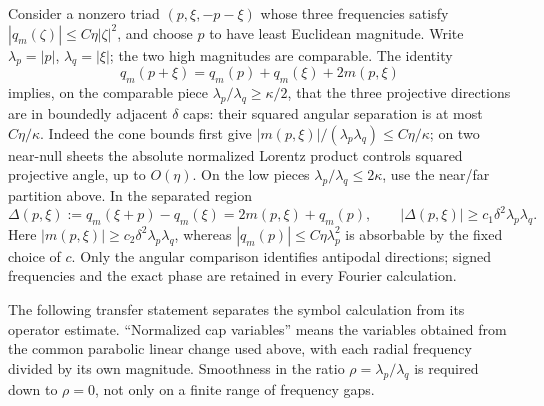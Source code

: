 \documentclass[11pt,a4paper]{article}
\numberwithin{equation}{section}
\theoremstyle{definition}
\begin{document}
Consider a nonzero triad $(p,\xi,-p-\xi)$ whose three frequencies satisfy
$|q_m(\zeta)|\leq C\eta|\zeta|^2$, and choose $p$ to have least
Euclidean magnitude. Write $\lambda_p=|p|$, $\lambda_q=|\xi|$; the two high magnitudes
are comparable. The identity
\begin{equation*}
q_m(p+\xi)=q_m(p)+q_m(\xi)+2m(p,\xi)
\end{equation*}
implies, on the comparable piece $\lambda_p/\lambda_q\geq\kappa/2$, that the three projective directions are
in boundedly adjacent $\delta$ caps: their squared angular separation is
at most $C\eta/\kappa$. Indeed the cone bounds first give
$|m(p,\xi)|/(\lambda_p\lambda_q)\leq C\eta/\kappa$; on two near-null sheets the absolute
normalized Lorentz product controls squared projective angle, up to
$O(\eta)$. On the low pieces $\lambda_p/\lambda_q\leq2\kappa$, use the near/far
partition above. In the separated region
\begin{equation}\label{eq:analytic-phase-gap}
\Delta(p,\xi):=q_m(\xi+p)-q_m(\xi)
=2m(p,\xi)+q_m(p),\qquad
|\Delta(p,\xi)|\geq c_1\delta^2\lambda_p\lambda_q.
\end{equation}
Here $|m(p,\xi)|\geq c_2\delta^2\lambda_p\lambda_q$, whereas
$|q_m(p)|\leq C\eta \lambda_p^2$ is absorbable by the fixed choice of $c$.
Only the angular comparison identifies antipodal directions; signed
frequencies and the exact phase are retained in every Fourier calculation.


The following transfer statement separates the symbol calculation from
its operator estimate. ``Normalized cap variables'' means the variables
obtained from the common parabolic linear change used above, with each
radial frequency divided by its own magnitude. Smoothness in the ratio
$\rho=\lambda_p/\lambda_q$ is required down to $\rho=0$, not only on a finite range
of frequency gaps.
\end{document}
